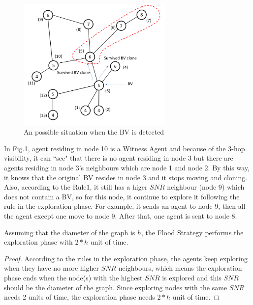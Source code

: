 \begin{figure}[H]
  \centering  
  \includegraphics[width=3in]{figures/Arbi3.png}
  \caption{An possible situation when the BV is detected}\label{fig:Arbi3}
\end{figure}    

In Fig.\ref{fig:Arbi3}, agent residing in node 10 is a Witness Agent and because of the 3-hop visibility, it can ``see" that there is no agent residing in node 3 but there are agents residing in node 3's neighbours which are node 1 and node 2. By this way, it knows that the original BV resides in node 3 and it stops moving and cloning. Also, according to the Rule1, it still has a higer $SNR$ neighbour (node 9) which does not contain a BV, so for this node, it continue to explore it following the rule in the exploration phase. For example, it sends an agent to node 9, then all the agent except one move to node 9. After that, one agent is sent to node 8. 

\begin{theorem}
Assuming that the diameter of the graph is $h$, the Flood Strategy performs the exploration phase with $2*h$ unit of time.
\end{theorem}
\begin{proof}
According to the rules in the exploration phase, the agents keep exploring when they have no more higher $SNR$ neighbours, which means the exploration phase ends when the node(s) with the highest $SNR$ is explored and this $SNR$ should be the diameter of the graph. Since exploring nodes with the same $SNR$ needs 2 units of time, the exploration phase needs $2*h$ unit of time.
\end{proof}


